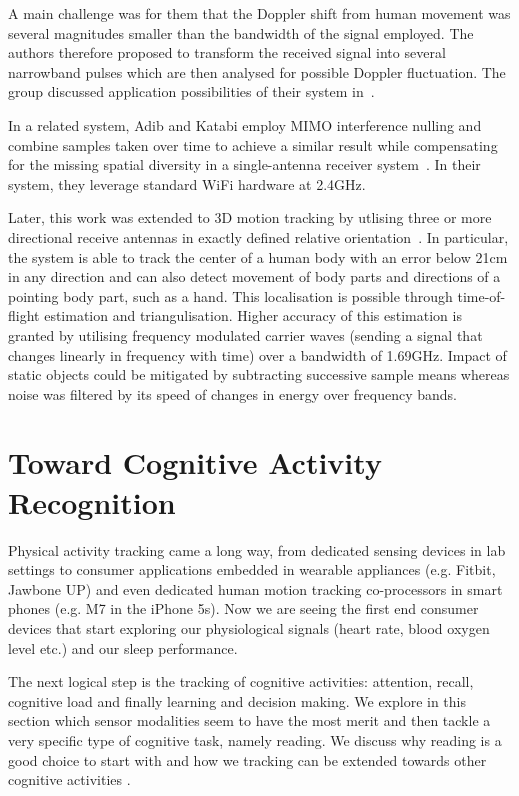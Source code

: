 \documentclass[journal]{IEEEtran}
\begin{document}
\begin{figure*}
A main challenge was for them that the Doppler shift from human movement was several magnitudes smaller than the bandwidth of the signal employed.
The authors therefore proposed to transform the received signal into several narrowband pulses which are then analysed for possible Doppler fluctuation.
The group discussed application possibilities of their system in~\cite{RFSensing_Kellog_2014}.

In a related system, Adib and Katabi employ MIMO interference nulling and combine samples taken over time to achieve a similar result while compensating for the missing spatial diversity in a single-antenna receiver system~\cite{Pervasive_Adib_2013}.
In their system, they leverage standard WiFi hardware at 2.4GHz.

Later, this work was extended to 3D motion tracking by utlising three or more directional receive antennas in exactly defined relative orientation~\cite{RFSensing_Adib_2014}. 
In particular, the system is able to track the center of a human body with an error below 21cm in any direction and can also detect movement of body parts and directions of a pointing body part, such as a hand. 
This localisation is possible through time-of-flight estimation and triangulisation.
Higher accuracy of this estimation is granted by utilising frequency modulated carrier waves (sending a signal that changes linearly in frequency with time) over a bandwidth of 1.69GHz.
Impact of static objects could be mitigated by subtracting successive sample means whereas noise was filtered by its speed of changes in energy over frequency bands. 
 \section{Toward Cognitive Activity Recognition}
\label{sectionCognitive}
Physical activity tracking came a long way, from dedicated sensing devices in lab settings to consumer applications embedded in wearable appliances (e.g. Fitbit, Jawbone UP) and even dedicated human motion tracking co-processors in smart phones (e.g. M7 in the iPhone 5s). 
Now we are seeing the first end consumer devices that start exploring our physiological signals (heart rate, blood oxygen level etc.) and our sleep performance. 

The next logical step is the tracking of cognitive activities:
attention, recall, cognitive load and finally learning and decision making. We explore in this section which sensor modalities seem to have the most merit and then tackle a very specific type of cognitive task, namely reading. 
We discuss why reading is a good choice to start with and how we tracking can be extended towards other cognitive activities
\cite{kunze2013activity}.


\end{figure*}
\end{document}
